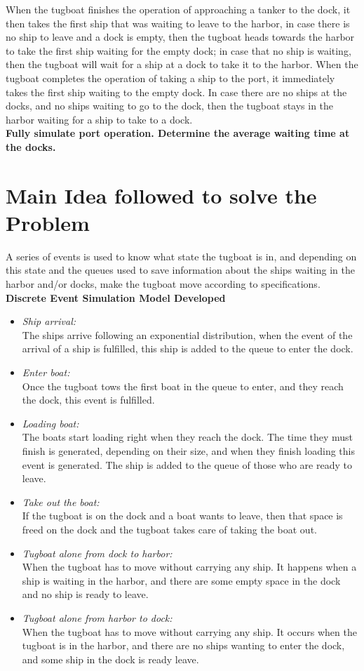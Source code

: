 \documentclass{llncs}
\begin{document}
When the tugboat finishes the operation of approaching a tanker to the dock, it then takes the first ship that was waiting to leave to the harbor, in case there is no ship to leave and a dock is empty, then the tugboat heads towards the harbor to take the first ship waiting for the empty dock; in case that no ship is waiting, then the tugboat will wait for a ship at a dock to take it to the harbor. When the tugboat completes the operation of taking a ship to the port, it immediately takes the first ship waiting to the empty dock. In case there are no ships at the docks, and no ships waiting to go to the dock, then the tugboat stays in the harbor waiting for a ship to take to a dock.\\

\textbf{ Fully simulate port operation. Determine the average waiting time at the docks.}
\section{Main Idea followed to solve the Problem}
A series of events is used to know what state the tugboat is in, and depending on this state and the queues used to save information about the ships waiting in the harbor and/or docks, make the tugboat move according to specifications. \\

\textbf{Discrete Event Simulation Model Developed}
\begin{itemize}
	\item \textit{Ship arrival:}\\ The ships arrive following an exponential distribution, when the event of the arrival of a ship is fulfilled, this ship is added to the queue to enter the dock.
	\item \textit{Enter boat:}\\ Once the tugboat tows the first boat in the queue to enter, and they reach the dock, this event is fulfilled.
	\item \textit{Loading boat:}\\ The boats start loading right when they reach the dock. The time they must finish is generated, depending on their size, and when they finish loading this event is generated. The ship is added to the queue of those who are ready to leave.
	\item \textit{Take out the boat:}\\ If the tugboat is on the dock and a boat wants to leave, then that space is freed on the dock and the tugboat takes care of taking the boat out.
	\item \textit{Tugboat alone from dock to harbor:}\\ When the tugboat has to move without carrying any ship. It happens when a ship is waiting in the harbor, and there are some empty space in the dock and no ship is ready to leave.
	\item \textit{Tugboat alone from harbor to dock:}\\ When the tugboat has to move without carrying any ship. It occurs when the tugboat is in the harbor, and there are no ships wanting to enter the dock, and some ship in the dock is ready leave.
\end{itemize}
\end{document}
